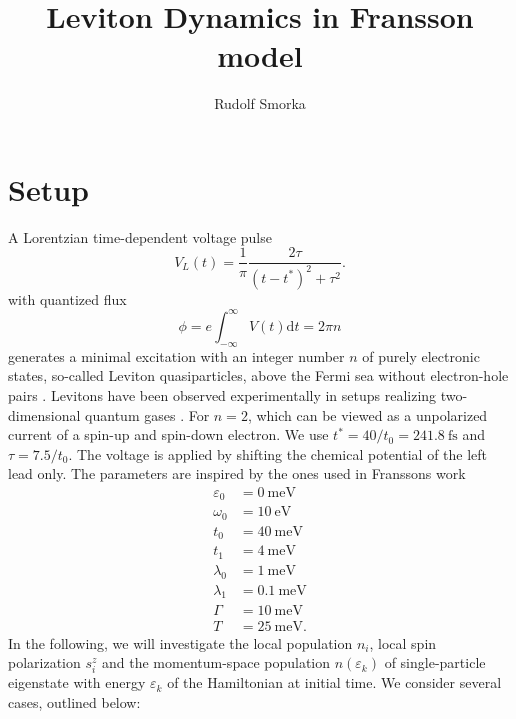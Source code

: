\documentclass{article}
\newcommand{\dif}{\mathrm{d}}
\begin{document}
\title{Leviton Dynamics in Fransson model}
\author{Rudolf Smorka}
\maketitle
\section{Setup}
A Lorentzian time-dependent voltage pulse
\begin{equation}
	V_L(t) =\frac{1}{\pi} \frac{2\tau}{(t-t^*)^2 + \tau^2}.
\end{equation}
with quantized flux 
\begin{equation}
	\phi = e\int_{-\infty}^\infty V(t)\dif t = 2\pi n
\end{equation}
generates a minimal excitation with an integer number $n$ of purely electronic states, so-called Leviton quasiparticles, above the Fermi sea without electron-hole pairs \cite{levitov1996electron}. Levitons have been observed experimentally in setups realizing two-dimensional quantum gases \cite{dubois2013minimal}. 
For $n=2$, which can be viewed as a unpolarized current of a spin-up and spin-down electron.  
We use $t^* = 40/t_0=\SI{241.8}{\femto\second}$ and $\tau = 7.5/t_0$. The voltage is applied by shifting the chemical potential of the left lead only. The parameters are inspired by the ones used in Franssons work
\begin{align}
	\varepsilon_0 &= \SI{0}{\milli\electronvolt}\\
	\omega_0 &= \SI{10}{\electronvolt}\\
	t_0 &= \SI{40}{\milli\electronvolt}\\
	t_1 &= \SI{4}{\milli\electronvolt}\\
	\lambda_0 &= \SI{1}{\milli\electronvolt}\\
	\lambda_1 &= \SI{0.1}{\milli\electronvolt}\\
	\Gamma &= \SI{10}{\milli\electronvolt}\\
	T &= \SI{25}{\milli\electronvolt}.
\end{align}
In the following, we will investigate the local population $n_i$, local spin polarization $s^z_i$ and the momentum-space population $n(\varepsilon_k)$ of single-particle eigenstate with energy $\varepsilon_k$ of the Hamiltonian at initial time. We consider several cases, outlined below:
\end{document}
